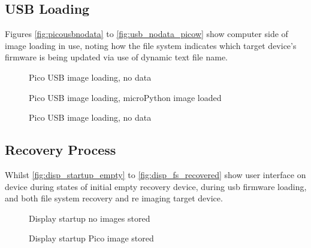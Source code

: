 \clearpage
\subsection{USB Loading}
Figures \autoref{fig:picousbnodata} to \autoref{fig:usb_nodata_picow} show computer side of image loading in use, noting how the file system indicates which target device's firmware is being updated via use of dynamic text file name.

\begin{figure}[ht]
	\centering
	\caption{Pico USB image loading, no data}
	\label{fig:picousbnodata}
\end{figure}

\begin{figure}[ht]
	\centering
	\caption{Pico USB image loading, microPython image loaded}
	\label{fig:picousbdata}
\end{figure}

\begin{figure}[ht]
	\centering
	\caption{Pico USB image loading, no data}
	\label{fig:usb_nodata_picow}
\end{figure}

\clearpage
\subsection{Recovery Process}
Whilst \autoref{fig:disp_startup_empty} to \autoref{fig:disp_fs_recovered} show user interface on device during states of initial empty recovery device, during \gls{usb} firmware loading, and both file system recovery and re imaging target device.

\begin{figure}[ht]
	\centering
	\caption{Display startup no images stored}
	\label{fig:disp_startup_empty}
\end{figure}

\begin{figure}[ht]
	\centering
	\caption{Display startup Pico image stored}
	\label{fig:disp_startup_pico}
\end{figure}

